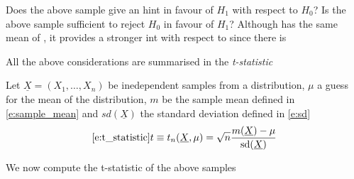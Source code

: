 \begin{knitrout}
\color{fgcolor}\begin{kframe}
\begin{alltt}
 \hlkwb{<-} \hldef{(}\hldef{,} \hldef{,} \hldef{,} \hldef{,} \hldef{)}
\end{alltt}
\end{kframe}
\end{knitrout}
      	Does the above sample give an hint in favour of $H_1$ with respect to $H_0$? Is the above sample sufficient to reject $H_0$ in favour of $H_1$?  Although  has the same mean of , it provides a stronger int with respect to  since there is 
\begin{knitrout}
\color{fgcolor}\begin{kframe}
\begin{alltt}
 \hlkwb{<-}    \hldef{(}\hldef{,} \hldef{,} \hldef{,} \hldef{,} \hldef{,} \hldef{,} \hldef{,} \hldef{,} \hldef{,} \hldef{,} \hldef{,} \hldef{,} \hldef{,} \hldef{,} \hldef{,} \hldef{,} \hldef{,} \hldef{,} \hldef{,} \hldef{)}
\end{alltt}
\end{kframe}
\end{knitrout}
	
	All the above considerations are summarised in the \emph{t-statistic}
      \begin{definition}[t statistic]
      	\label{d:t-statistic}
      	Let $\underline X = (X_1,\ldots, X_n)$ be inedependent samples from a distribution, $\mu$ a guess for the mean of the distribution, $ m$ be the sample mean defined in \eqref{e:sample_mean} and $sd(\underline{X})$ the standard deviation defined in \eqref{e:sd}
      	\begin{equation}
      		\eqref{e:t_statistic}
      		t\equiv t_n(\underline{X},  \mu) = \sqrt{n}\frac{ m(\underline{X})  - \mu   }{\text{sd}(\underline{X})}
      	\end{equation}
      \end{definition}
      	We now compute the t-statistic of the above samples
\begin{knitrout}
\color{fgcolor}\begin{kframe}
\begin{alltt}
 \hlkwb{<-} \hldef{(} \hldef{,} \hldef{) \{}
        \hlopt{*}\hldef{(} \hlopt{-} \hlopt{/}
\hldef{\}}
\end{alltt}
\end{kframe}
\end{knitrout}

